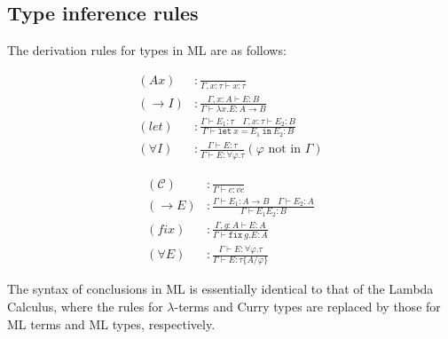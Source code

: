 \subsection{Type inference rules}
The derivation rules for types in \textsc{ML} are as follows:
\begin{center}
    \begin{minipage}{.4\textwidth}
        \begin{align*}
            (Ax) &: \frac{}{\Gamma, x: \tau \vdash x: \tau} \\[1em]
            (\rightarrow I) &: \frac{\Gamma, x: A \vdash E: B}{\Gamma \vdash \lambda x. E: A \rightarrow B} \\[1em]
            (let) &: \frac{\Gamma \vdash E_1: \tau \quad \Gamma, x: \tau \vdash E_2: B}{\Gamma \vdash \texttt{let}\ x = E_1\ \texttt{in}\ E_2: B} \\[1em]
            (\forall I) &: \frac{\Gamma \vdash E: \tau}{\Gamma \vdash E: \forall \varphi. \tau} (\text{$\varphi$ not in $\Gamma$})
        \end{align*}
    \end{minipage}%
    \begin{minipage}{.4\textwidth}
        \begin{align*}
            (\mathcal{C}) &: \frac{}{\Gamma \vdash c: vc} \\[1em]
            (\rightarrow E) &: \frac{\Gamma \vdash E_1: A \rightarrow B \quad \Gamma \vdash E_2: A}{\Gamma \vdash E_1 E_2: B} \\[1em]
            (fix) &: \frac{\Gamma, g: A \vdash E: A}{\Gamma \vdash \texttt{fix}\ g. E: A} \\[1em]
            (\forall E) &: \frac{\Gamma \vdash E: \forall \varphi. \tau}{\Gamma \vdash E: \tau \{A / \varphi\}}
        \end{align*}
    \end{minipage}
\end{center}
The syntax of conclusions in \textsc{ML} is essentially identical to that of the Lambda Calculus, where the rules for $\lambda$-terms and Curry types are replaced by those for \textsc{ML} terms and \textsc{ML} types, respectively.